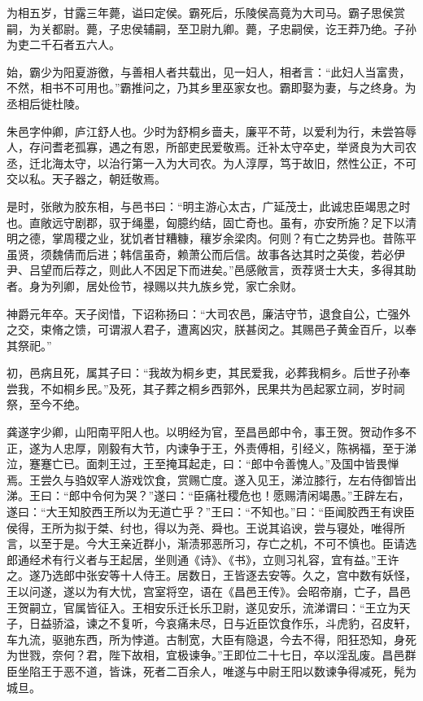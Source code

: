 \documentclass[]{article}
\begin{document}
为相五岁，甘露三年薨，谥曰定侯。霸死后，乐陵侯高竟为大司马。霸子思侯赏嗣，为关都尉。薨，子忠侯辅嗣，至卫尉九卿。薨，子忠嗣侯，讫王莽乃绝。子孙为吏二千石者五六人。

始，霸少为阳夏游徼，与善相人者共载出，见一妇人，相者言：``此妇人当富贵，不然，相书不可用也。''霸推问之，乃其乡里巫家女也。霸即娶为妻，与之终身。为丞相后徙杜陵。

朱邑字仲卿，庐江舒人也。少时为舒桐乡啬夫，廉平不苛，以爱利为行，未尝笞辱人，存问耆老孤寡，遇之有恩，所部吏民爱敬焉。迁补太守卒史，举贤良为大司农丞，迁北海太守，以治行第一入为大司农。为人淳厚，笃于故旧，然性公正，不可交以私。天子器之，朝廷敬焉。

是时，张敞为胶东相，与邑书曰：``明主游心太古，广延茂士，此诚忠臣竭思之时也。直敞远守剧郡，驭于绳墨，匈臆约结，固亡奇也。虽有，亦安所施？足下以清明之德，掌周稷之业，犹饥者甘糟糠，穰岁余梁肉。何则？有亡之势异也。昔陈平虽贤，须魏倩而后进；韩信虽奇，赖萧公而后信。故事各达其时之英俊，若必伊尹、吕望而后荐之，则此人不因足下而进矣。''邑感敞言，贡荐贤士大夫，多得其助者。身为列卿，居处俭节，禄赐以共九族乡党，家亡余财。

神爵元年卒。天子闵惜，下诏称扬曰：``大司农邑，廉洁守节，退食自公，亡强外之交，束脩之馈，可谓淑人君子，遭离凶灾，朕甚闵之。其赐邑子黄金百斤，以奉其祭祀。''

初，邑病且死，属其子曰：``我故为桐乡吏，其民爱我，必葬我桐乡。后世子孙奉尝我，不如桐乡民。''及死，其子葬之桐乡西郭外，民果共为邑起冢立祠，岁时祠祭，至今不绝。

龚遂字少卿，山阳南平阳人也。以明经为官，至昌邑郎中令，事王贺。贺动作多不正，遂为人忠厚，刚毅有大节，内谏争于王，外责傅相，引经义，陈祸福，至于涕泣，蹇蹇亡已。面刺王过，王至掩耳起走，曰：``郎中令善愧人。''及国中皆畏惮焉。王尝久与驺奴宰人游戏饮食，赏赐亡度。遂入见王，涕泣膝行，左右侍御皆出涕。王曰：``郎中令何为哭？''遂曰：``臣痛社稷危也！愿赐清闲竭愚。''王辟左右，遂曰：``大王知胶西王所以为无道亡乎？''王曰：``不知也。''曰：``臣闻胶西王有谀臣侯得，王所为拟于桀、纣也，得以为尧、舜也。王说其谄谀，尝与寝处，唯得所言，以至于是。今大王亲近群小，渐渍邪恶所习，存亡之机，不可不慎也。臣请选郎通经术有行义者与王起居，坐则通《诗》、《书》，立则习礼容，宜有益。''王许之。遂乃选郎中张安等十人侍王。居数日，王皆逐去安等。久之，宫中数有妖怪，王以问遂，遂以为有大忧，宫室将空，语在《昌邑王传》。会昭帝崩，亡子，昌邑王贺嗣立，官属皆征入。王相安乐迁长乐卫尉，遂见安乐，流涕谓曰：``王立为天子，日益骄溢，谏之不复听，今哀痛未尽，日与近臣饮食作乐，斗虎豹，召皮轩，车九流，驱驰东西，所为悖道。古制宽，大臣有隐退，今去不得，阳狂恐知，身死为世戮，奈何？君，陛下故相，宜极谏争。''王即位二十七日，卒以淫乱废。昌邑群臣坐陷王于恶不道，皆诛，死者二百余人，唯遂与中尉王阳以数谏争得减死，髡为城旦。
\end{document}
